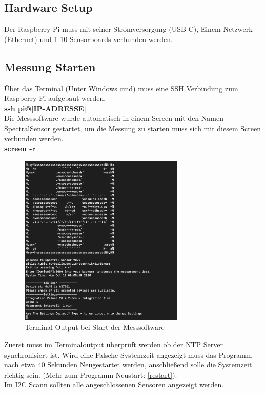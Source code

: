\subsection{Hardware Setup}
Der Raspberry Pi muss mit seiner Stromversorgung (USB C), Einem  Netzwerk (Ethernet) und 1-10 Sensorboards verbunden werden.
\subsection{Messung Starten}
Über das Terminal (Unter Windows cmd) muss eine SSH Verbindung zum Raspberry Pi aufgebaut werden.\\
\textbf{ssh pi@[IP-ADRESSE]}\\
Die Messsoftware wurde automatisch in einem Screen mit den Namen SpectralSensor gestartet, um die Messung zu starten muss sich mit diesem Screen verbunden werden.\\
\textbf{screen -r}\\
\begin{figure}[H]
\centering
\includegraphics[width=0.7\textwidth]{img/handbuch/check_settings}
\caption{Terminal Output bei Start der Messsoftware }
\label{fig:Start-der-Messsoftware}
\end{figure}
\noindent Zuerst muss im Terminaloutput überprüft werden ob der NTP Server synchronisiert ist.
Wird eine Falsche Systemzeit angezeigt muss das Programm nach etwa 40 Sekunden Neugestartet werden, anschließend solle die Systemzeit richtig sein. (Mehr zum Programm Neustart: \ref{restart}).\\
Im I2C Scann sollten alle angeschlossenen Sensoren angezeigt werden.\\
